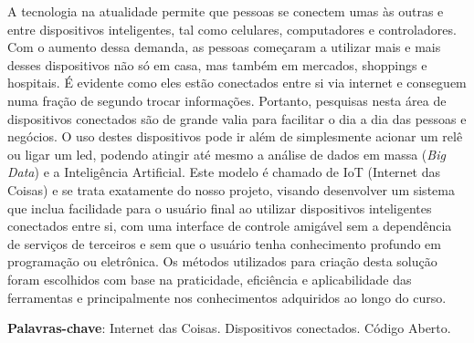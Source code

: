 \documentclass[../../layout.tex]{subfiles}
\begin{document}
\begin{resumo}
\hspace*{3em}
A tecnologia na atualidade permite que pessoas se conectem umas às outras e entre dispositivos inteligentes, tal como celulares, computadores e controladores. Com o aumento dessa demanda, as pessoas começaram a utilizar mais e mais desses dispositivos não só em casa, mas também em mercados, shoppings e hospitais. É evidente como eles estão conectados entre si via internet e conseguem numa fração de segundo trocar informações. Portanto, pesquisas nesta área de dispositivos conectados são de grande valia para facilitar o dia a dia das pessoas e negócios. O uso destes dispositivos pode ir além de simplesmente acionar um relê ou ligar um led, podendo atingir até mesmo a análise de dados em massa (\emph{Big Data}) e a Inteligência Artificial. Este modelo  é chamado de IoT (Internet das Coisas) e se trata exatamente do nosso projeto, visando desenvolver um sistema que inclua facilidade para o usuário final ao utilizar dispositivos inteligentes conectados entre si, com uma interface de controle amigável sem a dependência de serviços de terceiros e sem que o usuário tenha conhecimento profundo em programação ou eletrônica. Os métodos utilizados para criação desta solução foram escolhidos com base na praticidade, eficiência e aplicabilidade das ferramentas e principalmente nos conhecimentos adquiridos ao longo do curso.
\vspace{\onelineskip}

\noindent
\textbf{Palavras-chave}: Internet das Coisas. Dispositivos conectados. Código Aberto.
\end{resumo}
\end{document}
